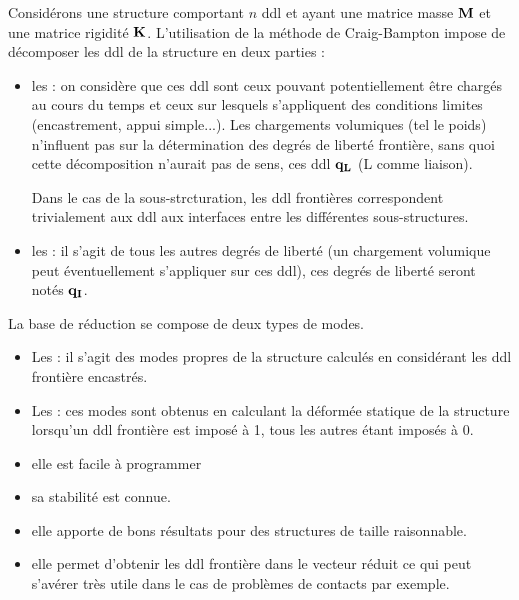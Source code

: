 Considérons une structure comportant $n$ ddl et ayant une matrice masse $\mathbf{M}$ et une matrice rigidité $\mathbf{K}$. 
L'utilisation de la méthode de Craig-Bampton 
impose de décomposer les ddl de la structure en deux parties :
\begin{itemize}
   \item les : on considère que ces ddl sont ceux pouvant potentiellement être chargés au cours du temps 
	et ceux sur lesquels s'appliquent des conditions limites (encastrement, appui simple...). Les chargements volumiques 
	(tel le poids) n'influent pas sur la détermination des degrés de liberté frontière, sans quoi cette décomposition n'aurait 
	pas de sens, ces ddl $\mathbf{q_L}$ (L comme liaison).

	Dans le cas de la sous-strcturation, les ddl frontières correspondent trivialement aux ddl aux interfaces entre
	les différentes sous-structures.
   \item les : il s'agit de tous les autres degrés de liberté (un chargement volumique peut éventuellement 
	s'appliquer sur ces ddl), ces degrés de liberté seront notés $\mathbf{q_I}$.
\end{itemize}

\medskip
La base de réduction se compose de deux types de modes.
\begin{itemize}
   \item Les : il s'agit des modes propres de la structure calculés en considérant les ddl frontière encastrés.
   \item Les : ces modes sont obtenus en calculant la déformée statique de la structure lorsqu'un ddl frontière 
	est imposé à 1, tous les autres étant imposés à 0.
\end{itemize}

\medskip
{}
\begin{itemize}
   \item elle est facile à programmer
   \item sa stabilité est connue. 
   \item elle apporte de bons résultats pour des structures de taille raisonnable. 
   \item elle permet d'obtenir les ddl frontière dans le vecteur réduit ce qui peut s'avérer très utile dans le cas de problèmes de contacts 
	par exemple.
\end{itemize}


